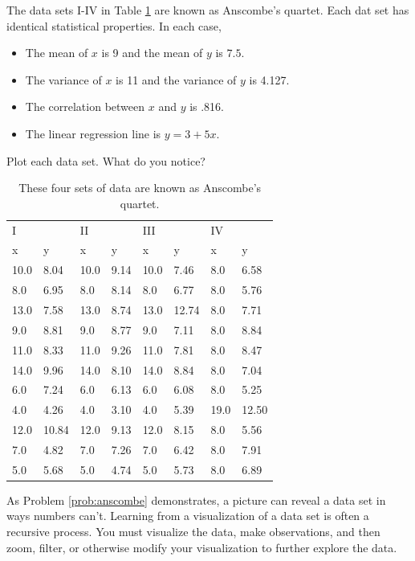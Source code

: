 \begin{problem}\label{prob:anscombe}
The data sets I-IV in Table \ref{table:anscombe} are known as Anscombe's quartet. 
Each dat set has identical statistical properties. 
In each case,
\begin{itemize}
\item The mean of $x$ is 9 and the mean of $y$ is $7.5$.
\item The variance of $x$ is 11 and the variance of $y$ is 4.127.
\item The correlation between $x$ and $y$ is .816.
\item The linear regression line is $y=3+5x$.
\end{itemize}
Plot each data set. What do you notice?

\begin{table}[H]
\begin{tabular}{l l  |  l l  |  l l  |  l l }
I & & II & & III & & IV\\
x & y & x & y & x & y & x & y \\
\hline
10.0 & 8.04 & 10.0 & 9.14 & 10.0 & 7.46 & 8.0 & 6.58 \\
8.0 & 6.95 & 8.0 & 8.14 & 8.0 & 6.77 & 8.0 & 5.76 \\
13.0 & 7.58 & 13.0 & 8.74 & 13.0 & 12.74 & 8.0 & 7.71 \\
9.0 & 8.81 & 9.0 & 8.77 & 9.0 & 7.11 & 8.0 & 8.84 \\
11.0 & 8.33 & 11.0 & 9.26 & 11.0 & 7.81 & 8.0 & 8.47 \\
14.0 & 9.96 & 14.0 & 8.10 & 14.0 & 8.84 & 8.0 & 7.04 \\
6.0 & 7.24 & 6.0 & 6.13 & 6.0 & 6.08 & 8.0 & 5.25 \\
4.0 & 4.26 & 4.0 & 3.10 & 4.0 & 5.39 & 19.0 & 12.50 \\
12.0 & 10.84 & 12.0 & 9.13 & 12.0 & 8.15 & 8.0 & 5.56 \\
7.0 & 4.82 & 7.0 & 7.26 & 7.0 & 6.42 & 8.0 & 7.91 \\
5.0 & 5.68 & 5.0 & 4.74 & 5.0 & 5.73 & 8.0 & 6.89 \\
\end{tabular}
\caption{These four sets of data are known as Anscombe's quartet.}
\label{table:anscombe}
\end{table}
\end{problem}

As Problem \ref{prob:anscombe} demonstrates, a picture can reveal a data set in ways numbers can't. 
Learning from a visualization of a data set is often a recursive process. 
You must visualize the data, make observations, and then zoom, filter, or otherwise modify your visualization to further explore the data.

